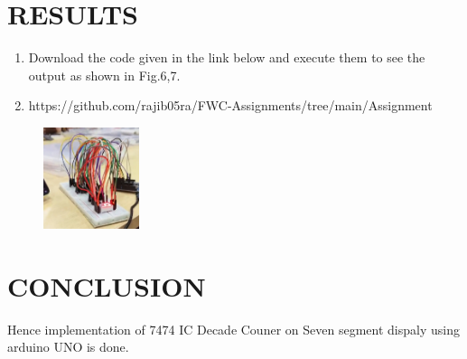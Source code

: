 \documentclass[conference]{IEEEtran}
\begin{document}
\section{RESULTS}
 \begin{enumerate}
	 \item Download the code given in the link below and execute them to see the output as shown in Fig.6,7. 
	 \item https://github.com/rajib05ra/FWC-Assignments/tree/main/Assignment%
 \end{enumerate}
 \begin{figure}[h] 
	\centering 
	\includegraphics[width=0.25\textwidth]{fig7-1.jpg   }
	\caption{\label{fig-6:Gates}}    
\end{figure}




\section{CONCLUSION}
Hence implementation of 7474 IC Decade Couner on Seven segment dispaly using arduino UNO is done.
\end{document}
